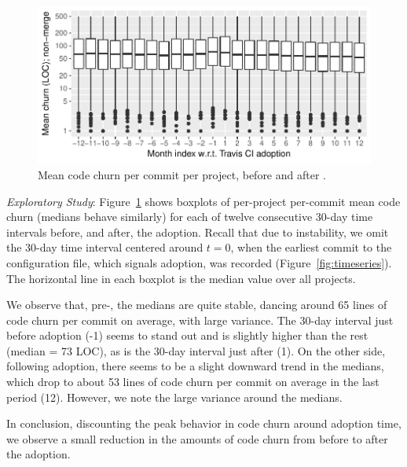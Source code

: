 \begin{figure}[t]
\centering
\includegraphics[width=\columnwidth, clip=true, trim=0 0 0 0]{figures/churn.pdf}
\caption{Mean code churn per commit per project, before and after \Tvi.}
\label{fig:churn}
\end{figure}

\smallskip\noindent \emph{Exploratory Study}: 
Figure~\ref{fig:churn} shows boxplots of per-project per-commit mean code 
churn (medians behave similarly) for each of twelve consecutive 30-day time 
intervals before, and after, the \Tvis adoption.
Recall that due to instability, we omit the 30-day time interval centered 
around $t = 0$, when the earliest commit to the \Tvi configuration file, which 
signals adoption, was recorded (Figure~\ref{fig:timeseries}).
The horizontal line in each boxplot is the median value over all projects.

We observe that, pre-\Tvi, the medians are quite stable, dancing around 65 
lines of code churn per commit on average, with large variance.
The 30-day interval just before \Tvis adoption (-1) seems to stand out and is 
slightly higher than the rest (median = 73 LOC), as is the 30-day interval just after 
\Tvi (1).
On the other side, following \Tvis adoption, there seems to be a slight downward 
trend in the medians, which drop to about 53 lines of code churn per commit on 
average in the last period (12).
However, we note the large variance around the medians.

In conclusion, discounting the peak behavior in code churn around adoption 
time, we observe a small reduction in the amounts of code churn from before 
to after the adoption.


